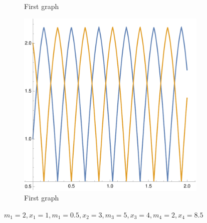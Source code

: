 \documentclass[english,master]{liumaiex}
\theoremstyle{plain}
\theoremstyle{definition}
\begin{document}
\begin{figure}[H]
\begin{subfigure}{0.3\textwidth}
        \caption{First graph}
    \end{subfigure}
	\hfill
	\begin{subfigure}{0.3\textwidth}
        \includegraphics[width=\textwidth]{graphs/per2N/m.pdf}
        \caption{First graph}
    \end{subfigure}
    \caption{$m_1 = 2, x_1 = 1, m_1 = 0.5, x_2 = 3, m_3 = 5, x_3 = 4, m_4 = 2, x_4 = 8.5$}
\end{figure}
\end{document}
